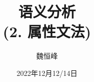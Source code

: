 \documentclass[]{beamer}
\title[语义分析]{语义分析 \\ (2. 属性文法)}
\author[魏恒峰]{\large 魏恒峰}
\institute{hfwei@nju.edu.cn}
\date{2022年12月12/14日}
\begin{document}
\maketitle




\thankyou{}

\end{document}
